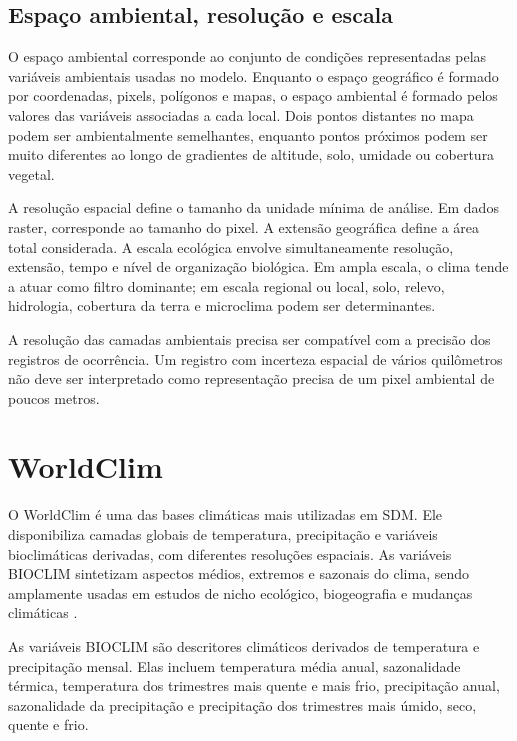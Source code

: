 \subsection{Espaço ambiental, resolução e escala}

O espaço ambiental corresponde ao conjunto de condições representadas pelas variáveis ambientais usadas no modelo. Enquanto o espaço geográfico é formado por coordenadas, pixels, polígonos e mapas, o espaço ambiental é formado pelos valores das variáveis associadas a cada local. Dois pontos distantes no mapa podem ser ambientalmente semelhantes, enquanto pontos próximos podem ser muito diferentes ao longo de gradientes de altitude, solo, umidade ou cobertura vegetal.

A resolução espacial define o tamanho da unidade mínima de análise. Em dados raster, corresponde ao tamanho do pixel. A extensão geográfica define a área total considerada. A escala ecológica envolve simultaneamente resolução, extensão, tempo e nível de organização biológica. Em ampla escala, o clima tende a atuar como filtro dominante; em escala regional ou local, solo, relevo, hidrologia, cobertura da terra e microclima podem ser determinantes.

\begin{atencao}[title={\faExclamationTriangle\quad Compatibilidade entre ocorrência e ambiente}]
	A resolução das camadas ambientais precisa ser compatível com a precisão dos registros de ocorrência. Um registro com incerteza espacial de vários quilômetros não deve ser interpretado como representação precisa de um pixel ambiental de poucos metros.
\end{atencao}

\section{WorldClim}

O WorldClim é uma das bases climáticas mais utilizadas em SDM. Ele disponibiliza camadas globais de temperatura, precipitação e variáveis bioclimáticas derivadas, com diferentes resoluções espaciais. As variáveis BIOCLIM sintetizam aspectos médios, extremos e sazonais do clima, sendo amplamente usadas em estudos de nicho ecológico, biogeografia e mudanças climáticas \parencite{fick2017worldclim}.

\begin{conceito}[title={\faBook\quad Variáveis BIOCLIM}]
	As variáveis BIOCLIM são descritores climáticos derivados de temperatura e precipitação mensal. Elas incluem temperatura média anual, sazonalidade térmica, temperatura dos trimestres mais quente e mais frio, precipitação anual, sazonalidade da precipitação e precipitação dos trimestres mais úmido, seco, quente e frio.
\end{conceito}

